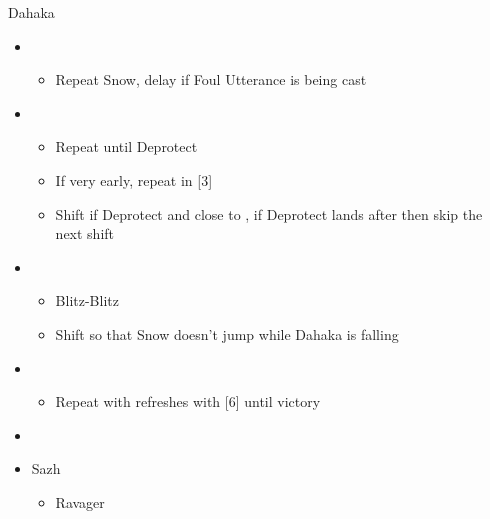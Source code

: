 \begin{paracol}{2}
\begin{battle}{Dahaka}
\begin{itemize}
			\item \first
			      \begin{itemize}
				      \item Repeat Snow, delay if Foul Utterance is being cast
			      \end{itemize}
			\item \fifth
			      \begin{itemize}
				      \item Repeat until Deprotect
				      \item If very early, repeat in [3]
				      \item Shift if Deprotect and close to \stagger, if Deprotect lands after \stagger then skip the next shift
			      \end{itemize}
			\item \second
			      \begin{itemize}
				      \item Blitz-Blitz
				      \item Shift so that Snow doesn't jump while Dahaka is falling
			      \end{itemize}
			\item \fourth
			      \begin{itemize}
				      \item Repeat with refreshes with [6] until victory
			      \end{itemize}
		\end{itemize}
	\end{battle}
	\switchcolumn*
	\begin{menu}
		\begin{itemize}
			\paradigm
			\begin{itemize}
				\item {}%
				      {}%
				      {\paradigmline{(\rav)}{\rav}{\rav}}%
				      {\paradigmline{\rav}{(\rav)}{(\med)}}%
				      {\paradigmline{\com}{\com}{(\med)}}%
				      {\paradigmline[5]{\textit{\rav}}{\textit{(\rav)}}{\textit{\sab}}}%
				      {\paradigmline{\com}{\com}{\rav}}
			\end{itemize}
			\crystarium
			\begin{itemize}
				\item Sazh
				      \begin{itemize}
					      \item Ravager
					            \begin{itemize}

\end{itemize}
\end{itemize}
\end{itemize}
\end{itemize}
\end{menu}
\end{paracol}
